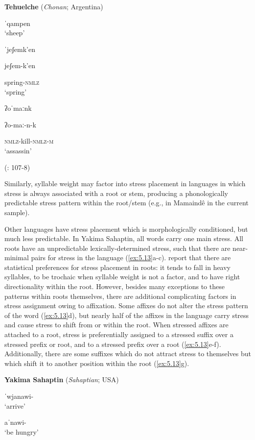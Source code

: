\ea\label{ex:5.12}
  \textbf{Tehuelche} (\textit{Chonan}; Argentina)

\ea  ˈqampen\\
\glt ‘sheep’

\ex  ˈjeʃemk’en

jeʃem-k’en

spring-\textsc{nmlz}\\
\glt ‘spring’

\ex   ʔoˈmaːnk

ʔo-maː-n-k

\textsc{nmlz}-kill-\textsc{nmlz-m}\\
\glt ‘assassin’

(\citealt{FernándezGaray1998}: 107-8)
\z
\z

Similarly, syllable weight may factor into stress placement in languages in which stress is always associated with a root or stem, producing a phonologically predictable stress pattern within the root/stem (e.g., in Mamaindê in the current sample).

  Other languages have stress placement which is morphologically conditioned, but much less predictable. In Yakima Sahaptin, all words carry one main stress. All roots have an unpredictable lexically-determined stress, such that there are near-minimal pairs for stress in the language (\ref{ex:5.13}a-c). \citet{HargusBeavert2005} report that there are statistical preferences for stress placement in roots: it tends to fall in heavy syllables, to be trochaic when syllable weight is not a factor, and to have right directionality within the root. However, besides many exceptions to these patterns within roots themselves, there are additional complicating factors in stress assignment owing to affixation. Some affixes do not alter the stress pattern of the word (\ref{ex:5.13}d), but nearly half of the affixes in the language carry stress and cause stress to shift from or within the root. When stressed affixes are attached to a root, stress is preferentially assigned to a stressed suffix over a stressed prefix or root, and to a stressed prefix over a root (\ref{ex:5.13}e-f). Additionally, there are some suffixes which do not attract stress to themselves but which shift it to another position within the root (\ref{ex:5.13}g).

\ea\label{ex:5.13}
  \textbf{Yakima Sahaptin} (\textit{Sahaptian}; USA)

\ea  ˈwjanawi-\\
\glt ‘arrive’

\ex  aˈnawi-\\
\glt ‘be hungry’

